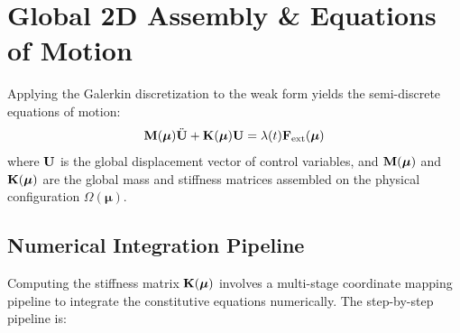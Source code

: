 \section{Global 2D Assembly \& Equations of Motion}
Applying the Galerkin discretization to the weak form yields the semi-discrete equations of motion:
\begin{equation}
    \mathbf{M}(\boldsymbol{\mu}) \ddot{\mathbf{U}} + \mathbf{K}(\boldsymbol{\mu}) \mathbf{U} = \lambda(t) \mathbf{F}_{\text{ext}}(\boldsymbol{\mu})
\end{equation}
where $\mathbf{U}$ is the global displacement vector of control variables, and $\mathbf{M}(\boldsymbol{\mu})$ and $\mathbf{K}(\boldsymbol{\mu})$ are the global mass and stiffness matrices assembled on the physical configuration $\Omega(\boldsymbol{\mu})$.

\subsection{Numerical Integration Pipeline}
Computing the stiffness matrix $\mathbf{K}(\boldsymbol{\mu})$ involves a multi-stage coordinate mapping pipeline to integrate the constitutive equations numerically. The step-by-step pipeline is:
